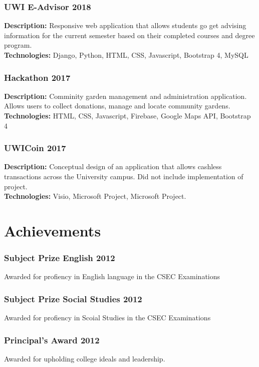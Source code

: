 \documentclass{article}
\begin{document}
\subsubsection{UWI E-Advisor \hfill{2018}}
{\bfseries Description:} Responsive web application that allows students go get advising information for the current semester based on their completed courses and degree program. 
\\{\bfseries Technologies:} Django, Python, HTML, CSS, Javascript, Bootstrap 4, MySQL

\subsubsection{Hackathon \hfill{2017}}
{\bfseries Description:} Comminity garden management and administration application. Allows users to collect donations, manage and locate community gardens. 
\\{\bfseries Technologies:} HTML, CSS, Javascript, Firebase, Google Maps API, Bootstrap 4

\subsubsection{UWICoin \hfill{2017}}
{\bfseries Description:} Conceptual design of an application that allows cashless transactions across the University campus. Did not include implementation of project.
\\{\bfseries Technologies:} Visio, Microsoft Project, Microsoft Project. 


\section{Achievements}
\subsubsection{Subject Prize English \hfill{2012}}
\tab Awarded for profiency in English language in the CSEC Examinations
\subsubsection{Subject Prize Social Studies \hfill{2012}}
\tab Awarded for profiency in Scoial Studies in the CSEC Examinations
\subsubsection{Principal's Award \hfill{2012}}
\tab Awarded for upholding college ideals and leadership.
\end{document}
